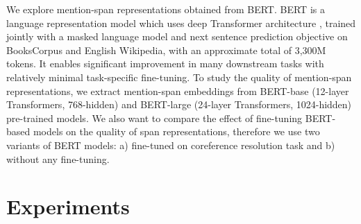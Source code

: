\documentclass[11pt]{article}
\begin{document}
We explore mention-span representations obtained from BERT. BERT \parencite{devlin2019bert} is a language representation model which uses deep Transformer architecture \parencite{transformers}, trained jointly with a masked language model and next sentence prediction objective on BooksCorpus \parencite{bookscorpus} and English Wikipedia, with an approximate total of 3,300M tokens. It enables significant improvement in many downstream tasks with relatively minimal task-specific fine-tuning. To study the quality of mention-span representations, we extract mention-span embeddings from BERT-base (12-layer Transformers, 768-hidden) and BERT-large (24-layer Transformers, 1024-hidden) pre-trained models. We also want to compare the effect of fine-tuning BERT-based models on the quality of span representations, therefore we use two variants of BERT models: a) fine-tuned on coreference resolution task and b) without any fine-tuning.



\section{Experiments}


\end{document}
